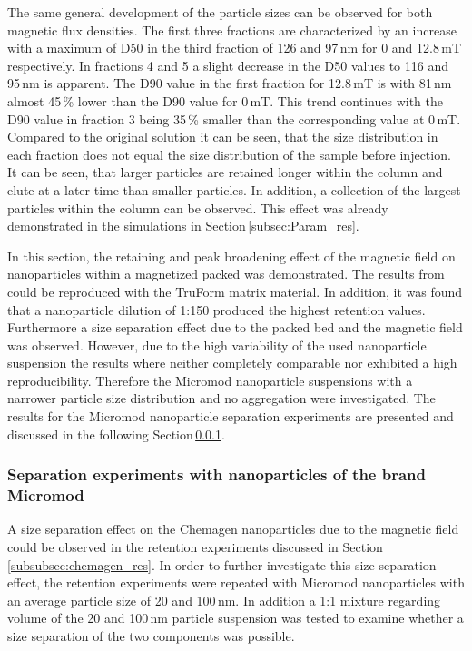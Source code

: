 The same general development of the particle sizes can be observed for both magnetic flux densities. The first three fractions are characterized by an increase with a maximum of D50 in the third fraction of 126 and 97\,nm for 0 and 12.8\,mT respectively. In fractions 4 and 5 a slight decrease in the D50 values to 116 and 95\,nm is apparent. The D90 value in the first fraction for 12.8\,mT is with 81\,nm almost 45\,\% lower than the D90 value for 0\,mT. This trend continues with the D90 value in fraction 3 being 35\,\% smaller than the corresponding value at 0\,mT. Compared to the original solution it can be seen, that the size distribution in each fraction does not equal the size distribution of the sample before injection. It can be seen, that larger particles are retained longer within the column and elute at a later time than smaller particles. In addition, a collection of the largest particles within the column can be observed.  This effect was already demonstrated in the simulations in Section\,\ref{subsec:Param_res}.     
  
In this section, the retaining and peak broadening effect of the magnetic field on nanoparticles within a magnetized packed was demonstrated. The results from \cite{AndreMaster} could be reproduced with the TruForm matrix material. In addition, it was found that a nanoparticle dilution of 1:150 produced the highest retention values. Furthermore a size separation effect due to the packed bed and the magnetic field was observed. However, due to the high variability of the used nanoparticle suspension the results where neither completely comparable nor exhibited a high reproducibility. Therefore the Micromod nanoparticle suspensions with a narrower particle size distribution and no aggregation were investigated. The results for the Micromod nanoparticle separation experiments are presented and discussed in the following Section\,\ref{subsubsec:micromod_res}. 

\FloatBarrier  
\subsubsection{Separation experiments with nanoparticles of the brand Micromod}
\label{subsubsec:micromod_res}
A size separation effect on the Chemagen nanoparticles due to the magnetic field could be observed in the retention experiments discussed in Section\,\ref{subsubsec:chemagen_res}. In order to further investigate this size separation effect, the retention experiments were repeated with Micromod nanoparticles with an average particle size of 20 and 100\,nm. In addition a 1:1 mixture regarding volume of the 20 and 100\,nm particle suspension was tested to examine whether a size separation of the two components was possible. 

